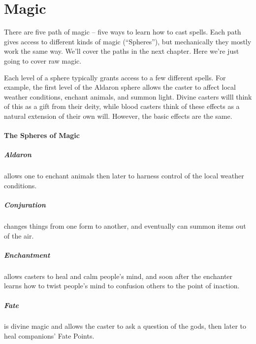 \chapter{Magic}

\begin{multicols}{2}

There are five path of magic -- five ways to learn how to cast spells.  Each path gives access to different kinds of magic (``Spheres''), but mechanically they mostly work the same way.
We'll cover the paths in the next chapter.  Here we're just going to cover raw magic.

Each level of a sphere typically grants access to a few different spells.  For example, the first level of the Aldaron sphere allows the caster to affect local weather conditions, enchant animals, and summon light.  Divine casters willl think of this as a gift from their deity, while blood casters think of these effects as a natural extension of their own will.  However, the basic effects are the same.

\subsubsection{The Spheres of Magic}

\paragraph{Aldaron}allows one to enchant animals then later to harness control of the local weather conditions.

\paragraph{Conjuration} changes things from one form to another, and eventually can summon items out of the air.

\paragraph{Enchantment} allows casters to heal and calm people's mind, and soon after the enchanter learns how to twist people's mind to confusion others to the point of inaction.

\paragraph{Fate} is divine magic and allows the caster to ask a question of the gods, then later to heal companions' Fate Points.


\end{multicols}
